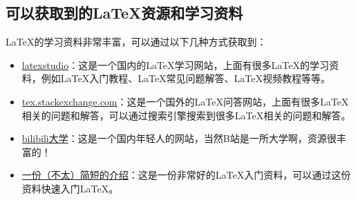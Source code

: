 \subsection{可以获取到的\LaTeX{}资源和学习资料}
\LaTeX{}的学习资料非常丰富，可以通过以下几种方式获取到：
\begin{itemize}
    \item \href{https://www.latexstudio.net/}{latexstudio}：这是一个国内的\LaTeX{}学习网站，上面有很多\LaTeX{}的学习资料，例如\LaTeX{}入门教程、\LaTeX{}常见问题解答、\LaTeX{}视频教程等等。
    \item \href{https://tex.stackexchange.com}{tex.stackexchange.com}：这是一个国外的\LaTeX{}问答网站，上面有很多\LaTeX{}相关的问题和解答，可以通过搜索引擎搜索到很多\LaTeX{}相关的问题和解答。
    \item \href{https://www.bilibili.com}{bilibili大学}：这是一个国内年轻人的网站，当然B站是一所大学啊，资源很丰富的！
    \item \href{https://logic.pku.edu.cn/docs/20220116210822631003.pdf}{一份（不太）简短的\LaTeXe{}介绍}：这是一份非常好的\LaTeX{}入门资料，可以通过这份资料快速入门\LaTeX{}。
\end{itemize}
